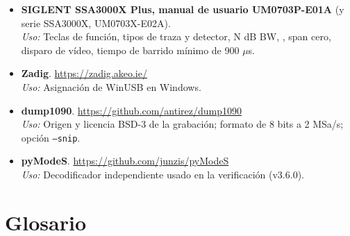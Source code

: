 \begin{itemize}[itemsep=0.45em]
    \emph{Uso:} Rangos, RBW 1 Hz--1 MHz, VBW 1 Hz--3 MHz, disparo Free/Video/External, entrada N 50 $\Omega$, límites de entrada, opciones TG y AMK.
  \item \textbf{SIGLENT SSA3000X Plus, manual de usuario UM0703P-E01A} (y serie SSA3000X, UM0703X-E02A).\\
    \emph{Uso:} Teclas de función, tipos de traza y detector, N dB BW, , span cero, disparo de vídeo, tiempo de barrido mínimo de 900 $\mu$s.
  \item \textbf{Zadig}. \url{https://zadig.akeo.ie/}\\
    \emph{Uso:} Asignación de WinUSB en Windows.
  \item \textbf{dump1090}. \url{https://github.com/antirez/dump1090}\\
    \emph{Uso:} Origen y licencia BSD-3 de la grabación; formato de 8 bits a 2 MSa/s; opción \texttt{--snip}.
  \item \textbf{pyModeS}. \url{https://github.com/junzis/pyModeS}\\
    \emph{Uso:} Decodificador independiente usado en la verificación (v3.6.0).
\end{itemize}

\section{Glosario}

